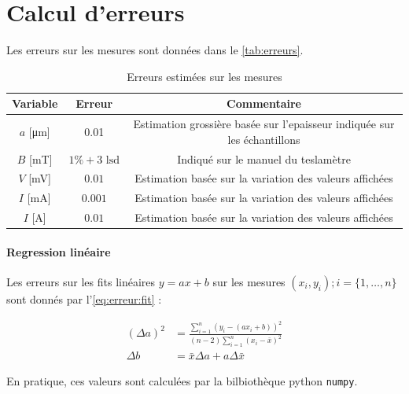 \section{Calcul d'erreurs}
\label{sec:erreurs}

Les erreurs sur les mesures sont données dans le \autoref{tab:erreurs}.

\begin{table}[h]
    \centering
    \begin{tabulary}{\textwidth}{C C C}
        \toprule
        Variable & Erreur & Commentaire \\
        \midrule
        \(a\) [\si{\micro\meter}] & 0.01 & Estimation grossière basée sur l'epaisseur indiquée sur les échantillons \\
        \(B\) [\si{\milli\tesla}] & \(1\% + 3\textrm{ lsd}\) & Indiqué sur le manuel du teslamètre \\
        \(V\) [\si{\milli\volt}] & \(0.01\) & Estimation basée sur la variation des valeurs affichées \\
        \(I\) [\si{\milli\ampere}] & \(0.001\) & Estimation basée sur la variation des valeurs affichées \\
        \(I\) [\si{\ampere}] & \(0.01\) & Estimation basée sur la variation des valeurs affichées \\
        \bottomrule
    \end{tabulary}
    \caption{Erreurs estimées sur les mesures}
    \label{tab:erreurs}
\end{table}

\paragraph*{Regression linéaire}
Les erreurs sur les fits linéaires \(y = ax + b\) sur les mesures \((x_i, y_i) ; i = \{1, \hdots, n\}\) sont donnés par l'\autoref{eq:erreur:fit} \cite{erreursmesure}:

\begin{equation}
    \label{eq:erreur:fit}
    \begin{aligned}
        (\Delta a)^2 &= \frac{\sum_{i=1}^{n}(y_i - (a x_i + b))^2}{(n-2) \sum_{i=1}^{n}(x_i - \bar{x})^2}\\
        \Delta b &= \bar{x} \Delta a + a \Delta \bar{x}
    \end{aligned}
\end{equation}

En pratique, ces valeurs sont calculées par la bilbiothèque python \texttt{numpy}.

